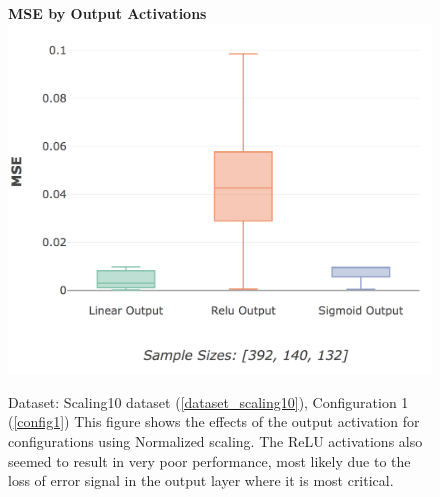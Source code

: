 \documentclass[a4paper,11pt,oneside]{article}
\theoremstyle{plain}
\theoremstyle{definition}
\begin{document}
	\begin{figure}[H]
		\centering
		\textbf{MSE by Output Activations}
		\includegraphics[scale=0.4]{images/results/activations/actual_mse_output.png}
		\caption[MSE by Output Activations]
		{Dataset: Scaling10 dataset (\ref{dataset_scaling10}), Configuration 1 (\ref{config1})
		\newline This figure shows the effects of the output activation for configurations using Normalized scaling. The ReLU activations also seemed to result in very poor performance, most likely due to the loss of error signal in the output layer where it is most critical. }
		\label{figure-actual_mse_output}
	\end{figure}%
	
\end{document}
